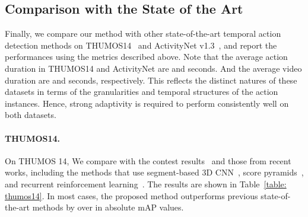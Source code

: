 \documentclass[10pt,twocolumn,letterpaper]{article}
\begin{document}
\subsection{Comparison with the State of the Art}

Finally, we compare our method with other state-of-the-art temporal action detection methods on THUMOS14~\cite{Jiang2014THUMOS14} and ActivityNet v1.3~\cite{caba2015activitynet},
and report the performances using the metrics described above.
Note that the average action duration in THUMOS14 and ActivityNet are  and  seconds.
And the average video duration are  and  seconds, respectively.
This reflects the distinct natures of these datasets
in terms of the granularities and temporal structures of the action instances.
Hence, strong adaptivity is required to perform consistently well on both datasets.

\vspace{-12pt}
\paragraph{THUMOS14.}
On THUMOS 14,
We compare with the contest results~\cite{wang2014action,oneata2014lear,Richard2016Language}
and those from recent works, including the methods that use segment-based 3D CNN~\cite{Shou2016SCNN},
score pyramids~\cite{Yuan2016ScorePyramids}, and recurrent reinforcement learning~\cite{Yeung2016FrameGlimpse}.
The results are shown in Table~\ref{table: thumos14}.
In most cases, the proposed method outperforms previous state-of-the-art methods by over  in absolute mAP values.
\end{document}
